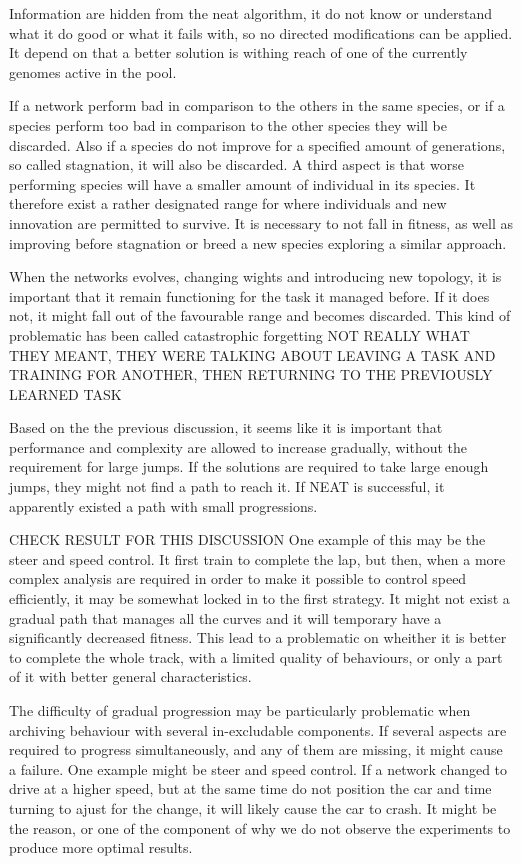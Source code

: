 Information are hidden from the neat algorithm, it do not know or understand what it do good or what it fails with, so no directed modifications can be applied. It depend on that a better solution is withing reach of one of the currently genomes active in the pool.

If a network perform bad in comparison to the others in the same species, or if a species perform too bad in comparison to the other species they will be discarded\cite{stanley:neat}. Also if a species do not improve for a specified amount of generations, so called stagnation, it will also be discarded. A third aspect is that worse performing species will have a smaller amount of individual in its species. It therefore exist a rather designated range for where individuals and new innovation are permitted to survive. It is necessary to not fall in fitness, as well as improving before stagnation or breed a new species exploring a similar approach.

When the networks evolves, changing wights and introducing new topology, it is important that it remain functioning for the task it managed before. If it does not, it might fall out of the favourable range and becomes discarded. This kind of problematic has been called catastrophic forgetting\cite{gomez:CoSyNE} NOT REALLY WHAT THEY MEANT, THEY WERE TALKING ABOUT LEAVING A TASK AND TRAINING FOR ANOTHER, THEN RETURNING TO THE PREVIOUSLY LEARNED TASK

Based on the the previous discussion, it seems like it is important that performance and complexity are allowed to increase gradually, without the requirement for large jumps. If the solutions are required to take large enough jumps, they might not find a path to reach it. If NEAT is successful, it apparently existed a path with small progressions.

CHECK RESULT FOR THIS DISCUSSION One example of this may be the steer and speed control. It first train to complete the lap, but then, when a more complex analysis are required in order to make it possible to control speed efficiently, it may be somewhat locked in to the first strategy. It might not exist a gradual path that manages all the curves and it will temporary have a significantly decreased fitness. This lead to a problematic on wheither it is better to complete the whole track, with a limited quality of behaviours, or only a part of it with better general characteristics.

The difficulty of gradual progression may be particularly problematic when archiving behaviour with several in-excludable components. If several aspects are required to progress simultaneously, and any of them are missing, it might cause a failure. One example might be steer and speed control. If a network changed to drive at a higher speed, but at the same time do not position the car and time turning to ajust for the change, it will likely cause the car to crash. It might be the reason, or one of the component of why we do not observe the experiments to produce more optimal results.

